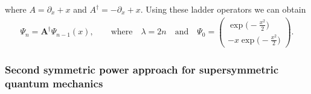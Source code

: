 \documentclass[10pt,a4paper]{amsart}
\numberwithin{equation}{section}
\begin{document}
where $A= \partial_x + x$ and $A^\dag = -\partial_x + x$. Using these ladder operators we can obtain
\begin{gather*}
\Psi_n=\mathbf{A}^\dagger \Psi_{n-1}(x), \qquad \textrm{where} \quad
\lambda=2n \quad \textrm{and} \quad \Psi_0=\begin{pmatrix}\exp\bigl(-\frac{x^2}{2}\bigr)\\[1mm] -x\exp\bigl(-\frac{x^2}{2}\bigr)\end{pmatrix}\!.
\end{gather*}


\subsubsection{Second symmetric power approach for supersymmetric quantum mechanics}
\end{document}
